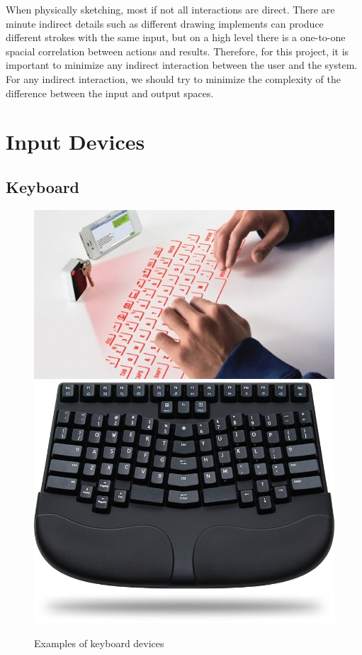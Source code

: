 \documentclass[11pt]{report}
\begin{document}
When physically sketching, most if not all interactions are direct. 
There are minute indirect details such as different drawing implements can produce different strokes with the same input, but on a high level there is a one-to-one spacial correlation between actions and results.
Therefore, for this project, it is important to minimize any indirect interaction between the user and the system.
For any indirect interaction, we should try to minimize the complexity of the difference between the input and output spaces.

\section{Input Devices}
\subsection{Keyboard}

\begin{figure}
\includegraphics[width=\textwidth]{virtual-keyboard}
\includegraphics[width=\textwidth]{ergonomickeyboard}
\caption{Examples of keyboard devices}
\end{figure}
\end{document}

